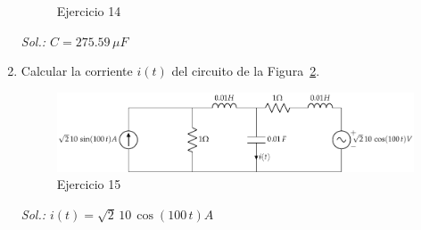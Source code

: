 \begin{enumerate}
\begin{figure}[H]
	        \caption{Ejercicio 14}
	        \label{fig.ejemplo9_BT2}
	    \end{figure}
\emph{Sol.: $C=275.59\,\mu F$}
\item Calcular la corriente $i(t)$ del circuito de la Figura~\ref{fig.ejercicio13_BT2}.
\begin{figure}[H]
    \centering
    \includegraphics[width=\linewidth]{../figs/ejercicio13_BT2.pdf}
    \caption{Ejercicio 15}
    \label{fig.ejercicio13_BT2}
\end{figure}
\emph{Sol.: $i(t)=\sqrt{2}\,10\,\cos(100\,t) A$}


\end{enumerate}
